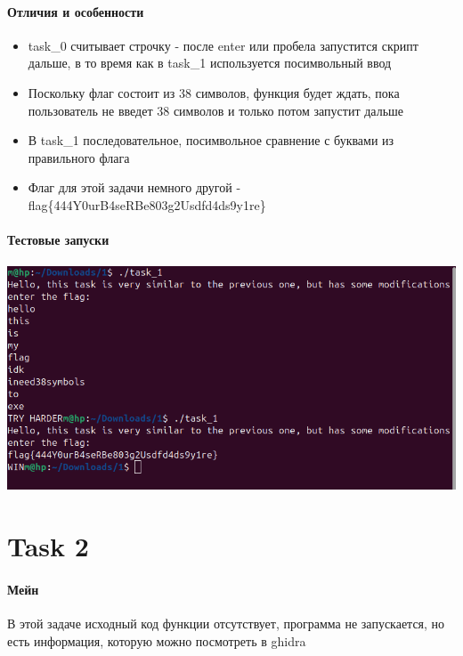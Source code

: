     \paragraph{Отличия и особенности}
    \begin{itemize}
        \item task\_0 считывает строчку - после enter или пробела запустится скрипт дальше, в то время как в task\_1 используется посимвольный ввод

        \item Поскольку флаг состоит из 38 символов, функция будет ждать, пока пользователь не введет 38 символов и только потом запустит дальше

        \item В task\_1 последовательное, посимвольное сравнение с буквами из правильного флага

        \item Флаг для этой задачи немного другой - flag\{444Y0urB4seRBe803g2Usdfd4ds9y1re\}
    \end{itemize}

    \paragraph{Тестовые запуски}

    \paragraph{}

    \includegraphics[width=0.75\linewidth]{static/solution_task_1.png}


    \section*{Task 2}

    \paragraph{Мейн}
    В этой задаче исходный код функции отсутствует, программа не запускается, но есть информация, которую можно посмотреть в ghidra

